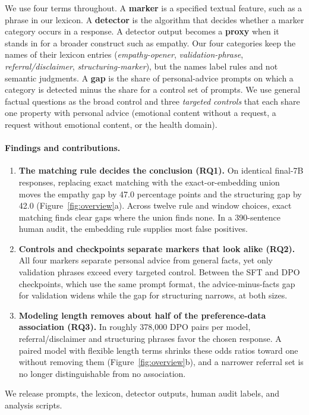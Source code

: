 \documentclass[11pt]{article}
\newif\ifpivot
\begin{document}
We use four terms throughout. A \textbf{marker} is a specified textual
feature, such as a phrase in our lexicon. A \textbf{detector} is the algorithm
that decides whether a marker category occurs in a response. A detector output
becomes a \textbf{proxy} when it stands in for a broader construct such as
empathy. Our four categories keep the names of their lexicon entries
(\emph{empathy-opener}, \emph{validation-phrase}, \emph{referral/disclaimer},
\emph{structuring-marker}), but the names label rules and not semantic
judgments. A \textbf{gap} is the share of personal-advice prompts on which a
category is detected minus the share for a control set of prompts. We use
general factual questions as the broad control and three \emph{targeted
controls} that each share one property with personal advice (emotional
content without a request, a request without emotional content, or the
health domain).

\paragraph{Findings and contributions.}
\begin{enumerate}\itemsep2pt
\item \textbf{The matching rule decides the conclusion (RQ1).}
On identical final-7B responses, replacing exact matching with the
exact-or-embedding union moves the empathy gap by 47.0 percentage points and
the structuring gap by 42.0 (Figure~\ref{fig:overview}a). Across twelve rule
and window choices, exact matching finds clear gaps where the union finds
none. In a 390-sentence human audit, the embedding rule supplies most false
positives.
\item \textbf{Controls and checkpoints separate markers that look alike
(RQ2).} All four markers separate personal advice from general facts, yet only
validation phrases exceed every targeted control. Between the SFT and DPO
checkpoints, which use the same prompt format, the advice-minus-facts gap for
validation widens while the gap for structuring narrows, at both sizes.
\item \textbf{Modeling length removes about half of the preference-data
association (RQ3).} In roughly 378,000 DPO pairs per model, referral/disclaimer and
structuring phrases favor the chosen response. A paired model with flexible
length terms shrinks these odds ratios toward one without removing them
(Figure~\ref{fig:overview}b), and a narrower referral set is no longer
distinguishable from no association.
\ifpivot
\item \textbf{Editing the preference data tests the association causally
(RQ4).} Eight 1B DPO retrainings on four data arms, scored on a fixed
256-token window, give \pivNSig{} of four pre-specified target contrasts
with Holm $p<.05$, with untargeted markers as negative controls
(Table~\ref{tab:pivot}).
\fi
\end{enumerate}
We release prompts, the lexicon, detector outputs, human audit labels, and analysis
scripts.
\end{document}
